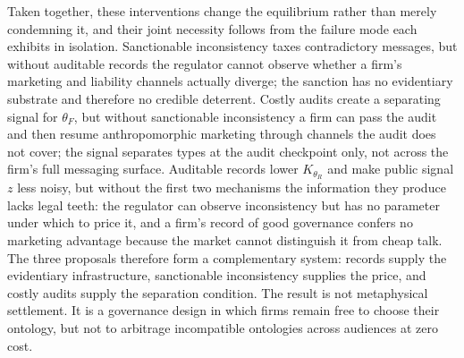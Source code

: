 Taken together, these interventions change the equilibrium rather than merely
condemning it, and their joint necessity follows from the failure mode each
exhibits in isolation. Sanctionable inconsistency taxes contradictory messages,
but without auditable records the regulator cannot observe whether a firm's
marketing and liability channels actually diverge; the sanction has no
evidentiary substrate and therefore no credible deterrent. Costly audits create
a separating signal for $\theta_F$, but without sanctionable inconsistency a
firm can pass the audit and then resume anthropomorphic marketing through
channels the audit does not cover; the signal separates types at the audit
checkpoint only, not across the firm's full messaging surface. Auditable records
lower $K_{\theta_R}$ and make public signal $z$ less noisy, but without the
first two mechanisms the information they produce lacks legal teeth: the
regulator can observe inconsistency but has no parameter under which to price
it, and a firm's record of good governance confers no marketing advantage
because the market cannot distinguish it from cheap talk. The three proposals
therefore form a complementary system: records supply the evidentiary
infrastructure, sanctionable inconsistency supplies the price, and costly
audits supply the separation condition. The result is not metaphysical
settlement. It is a governance design in which firms remain free to choose their
ontology, but not to arbitrage incompatible ontologies across audiences at zero
cost.
